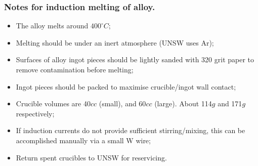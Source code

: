 \subsubsection{Notes for induction melting of \MgZnCa alloy.}
\begin{itemize}
\item The \MgZnCa alloy melts around $400^{\circ}C$;
\item Melting should be under an inert atmosphere (UNSW uses Ar);
\item Surfaces of alloy ingot pieces should be lightly sanded with 320 grit paper to remove contamination before melting;
\item Ingot pieces should be packed to maximise crucible/ingot wall contact;
\item Crucible volumes are 40$cc$ (small), and 60$cc$ (large). About 114$g$ and 171$g$ respectively;
\item If induction currents do not provide sufficient stirring/mixing, this can be accomplished manually via a small W wire; 
\item Return spent crucibles to UNSW for reservicing. 
\end{itemize}
